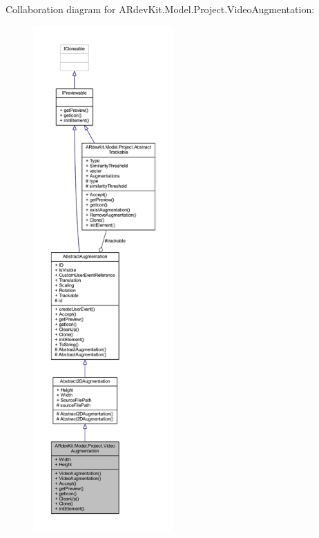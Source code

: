 Collaboration diagram for A\-Rdev\-Kit.\-Model.\-Project.\-Video\-Augmentation\-:
\nopagebreak
\begin{figure}[H]
\begin{center}
\leavevmode
\includegraphics[height=550pt]{class_a_rdev_kit_1_1_model_1_1_project_1_1_video_augmentation__coll__graph}
\end{center}
\end{figure}

